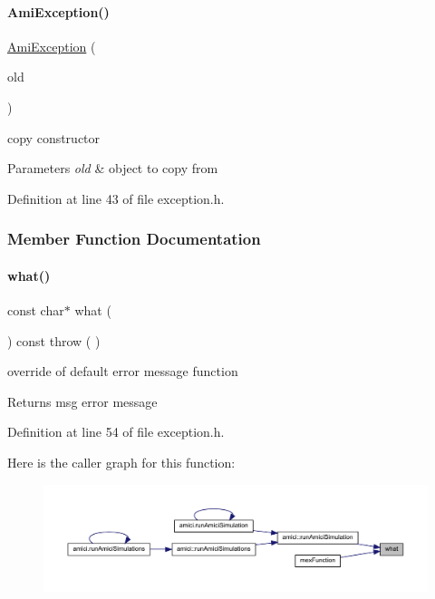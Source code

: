 \paragraph{\texorpdfstring{AmiException()}{AmiException()}\hspace{0.1cm}{\footnotesize\ttfamily [2/2]}}
{\footnotesize\ttfamily \mbox{\hyperlink{classamici_1_1_ami_exception}{Ami\+Exception}} (\begin{DoxyParamCaption}\item[{const \mbox{\hyperlink{classamici_1_1_ami_exception}{Ami\+Exception}} \&}]{old }\end{DoxyParamCaption})}

copy constructor 
\begin{DoxyParams}{Parameters}
{\em old} & object to copy from\\
\hline
\end{DoxyParams}


Definition at line 43 of file exception.\+h.



\subsubsection{Member Function Documentation}
\mbox{\label{classamici_1_1_ami_exception_a79009ed133fa02b942ddce8f0b987f3e}} 
\paragraph{\texorpdfstring{what()}{what()}}
{\footnotesize\ttfamily const char$\ast$ what (\begin{DoxyParamCaption}{ }\end{DoxyParamCaption}) const throw ( ) }

override of default error message function \begin{DoxyReturn}{Returns}
msg error message 
\end{DoxyReturn}


Definition at line 54 of file exception.\+h.

Here is the caller graph for this function\+:
\nopagebreak
\begin{figure}[H]
\begin{center}
\leavevmode
\includegraphics[width=350pt]{classamici_1_1_ami_exception_a79009ed133fa02b942ddce8f0b987f3e_icgraph}
\end{center}
\end{figure}
\mbox{\label{classamici_1_1_ami_exception_abd4eec3294e3af56ff54130ca3f2dea9}} 
